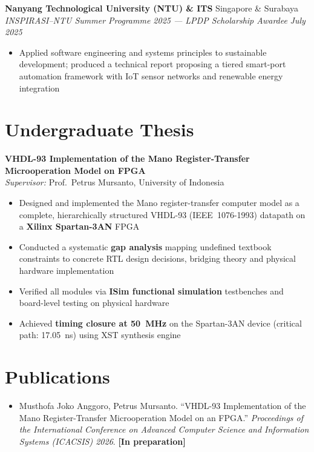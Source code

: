 \documentclass[11pt,a4paper]{article}
\newcommand{\entryheader}[4]{%
    {\small\textbf{#1}} \hfill {\small #2} \\
    {\small\textit{#3}} \hfill {\small\textit{#4}}%
}
\begin{document}
\vspace{3pt}
\entryheader{Nanyang Technological University (NTU) \& ITS}{Singapore \& Surabaya}{INSPIRASI--NTU Summer Programme 2025 --- LPDP Scholarship Awardee}{July 2025}
\begin{itemize}[leftmargin=1.5em, itemsep=1pt, topsep=2pt]
    \item Applied software engineering and systems principles to sustainable development; produced a technical report proposing a tiered smart-port automation framework with IoT sensor networks and renewable energy integration
\end{itemize}

\section*{Undergraduate Thesis}

{\small\textbf{VHDL-93 Implementation of the Mano Register-Transfer Microoperation Model on FPGA}} \\[1pt]
{\small\textit{Supervisor:} Prof.\ Petrus Mursanto, University of Indonesia}
\begin{itemize}[leftmargin=1.5em, itemsep=1pt, topsep=2pt]
    \item Designed and implemented the Mano register-transfer computer model as a complete, hierarchically structured VHDL-93 (IEEE~1076-1993) datapath on a \textbf{Xilinx Spartan-3AN} FPGA
    \item Conducted a systematic \textbf{gap analysis} mapping undefined textbook constraints to concrete RTL design decisions, bridging theory and physical hardware implementation
    \item Verified all modules via \textbf{ISim functional simulation} testbenches and board-level testing on physical hardware
    \item Achieved \textbf{timing closure at 50~MHz} on the Spartan-3AN device (critical path: 17.05~ns) using XST synthesis engine
\end{itemize}

\section*{Publications}

\begin{itemize}[leftmargin=1.5em, itemsep=2pt, topsep=2pt]
    \item Musthofa Joko Anggoro, Petrus Mursanto. ``VHDL-93 Implementation of the Mano Register-Transfer Microoperation Model on an FPGA.'' \textit{Proceedings of the International Conference on Advanced Computer Science and Information Systems (ICACSIS) 2026}. \textbf{[In preparation]}
\end{itemize}
\end{document}
